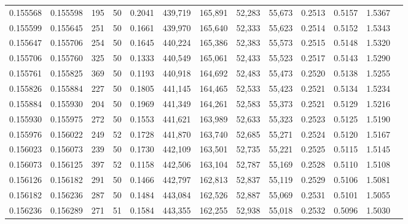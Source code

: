 \begin{tabular}{rrrrrrrrrrrrr}
0.155568 & 0.155598 &   195 &  50 &                                     0.2041 & 439,719 & 165,891 &  52,283 &  55,673 & 0.2513 & 0.5157 & 1.5367 \\
0.155599 & 0.155645 &   251 &  50 &                                     0.1661 & 439,970 & 165,640 &  52,333 &  55,623 & 0.2514 & 0.5152 & 1.5343 \\
0.155647 & 0.155706 &   254 &  50 &                                     0.1645 & 440,224 & 165,386 &  52,383 &  55,573 & 0.2515 & 0.5148 & 1.5320 \\
0.155706 & 0.155760 &   325 &  50 &                                     0.1333 & 440,549 & 165,061 &  52,433 &  55,523 & 0.2517 & 0.5143 & 1.5290 \\
0.155761 & 0.155825 &   369 &  50 &                                     0.1193 & 440,918 & 164,692 &  52,483 &  55,473 & 0.2520 & 0.5138 & 1.5255 \\
0.155826 & 0.155884 &   227 &  50 &                                     0.1805 & 441,145 & 164,465 &  52,533 &  55,423 & 0.2521 & 0.5134 & 1.5234 \\
0.155884 & 0.155930 &   204 &  50 &                                     0.1969 & 441,349 & 164,261 &  52,583 &  55,373 & 0.2521 & 0.5129 & 1.5216 \\
0.155930 & 0.155975 &   272 &  50 &                                     0.1553 & 441,621 & 163,989 &  52,633 &  55,323 & 0.2523 & 0.5125 & 1.5190 \\
0.155976 & 0.156022 &   249 &  52 &                                     0.1728 & 441,870 & 163,740 &  52,685 &  55,271 & 0.2524 & 0.5120 & 1.5167 \\
0.156023 & 0.156073 &   239 &  50 &                                     0.1730 & 442,109 & 163,501 &  52,735 &  55,221 & 0.2525 & 0.5115 & 1.5145 \\
0.156073 & 0.156125 &   397 &  52 &                                     0.1158 & 442,506 & 163,104 &  52,787 &  55,169 & 0.2528 & 0.5110 & 1.5108 \\
0.156126 & 0.156182 &   291 &  50 &                                     0.1466 & 442,797 & 162,813 &  52,837 &  55,119 & 0.2529 & 0.5106 & 1.5081 \\
0.156182 & 0.156236 &   287 &  50 &                                     0.1484 & 443,084 & 162,526 &  52,887 &  55,069 & 0.2531 & 0.5101 & 1.5055 \\
0.156236 & 0.156289 &   271 &  51 &                                     0.1584 & 443,355 & 162,255 &  52,938 &  55,018 & 0.2532 & 0.5096 & 1.5030 \\

\end{tabular}
